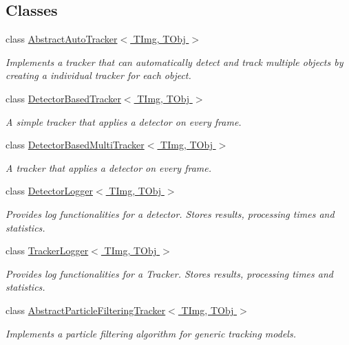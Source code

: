 \subsection*{Classes}
\begin{DoxyCompactItemize}
\item 
class \hyperlink{class_vision_core_1_1_abstractions_1_1_abstract_auto_tracker}{Abstract\+Auto\+Tracker$<$ T\+Img, T\+Obj $>$}
\begin{DoxyCompactList}\small\item\em Implements a tracker that can automatically detect and track multiple objects by creating a individual tracker for each object. \end{DoxyCompactList}\item 
class \hyperlink{class_vision_core_1_1_abstractions_1_1_detector_based_tracker}{Detector\+Based\+Tracker$<$ T\+Img, T\+Obj $>$}
\begin{DoxyCompactList}\small\item\em A simple tracker that applies a detector on every frame. \end{DoxyCompactList}\item 
class \hyperlink{class_vision_core_1_1_abstractions_1_1_detector_based_multi_tracker}{Detector\+Based\+Multi\+Tracker$<$ T\+Img, T\+Obj $>$}
\begin{DoxyCompactList}\small\item\em A tracker that applies a detector on every frame. \end{DoxyCompactList}\item 
class \hyperlink{class_vision_core_1_1_abstractions_1_1_detector_logger}{Detector\+Logger$<$ T\+Img, T\+Obj $>$}
\begin{DoxyCompactList}\small\item\em Provides log functionalities for a detector. Stores results, processing times and statistics. \end{DoxyCompactList}\item 
class \hyperlink{class_vision_core_1_1_abstractions_1_1_tracker_logger}{Tracker\+Logger$<$ T\+Img, T\+Obj $>$}
\begin{DoxyCompactList}\small\item\em Provides log functionalities for a Tracker. Stores results, processing times and statistics. \end{DoxyCompactList}\item 
class \hyperlink{class_vision_core_1_1_abstractions_1_1_abstract_particle_filtering_tracker}{Abstract\+Particle\+Filtering\+Tracker$<$ T\+Img, T\+Obj $>$}
\begin{DoxyCompactList}\small\item\em Implements a particle filtering algorithm for generic tracking models. \end{DoxyCompactList}\end{DoxyCompactItemize}


